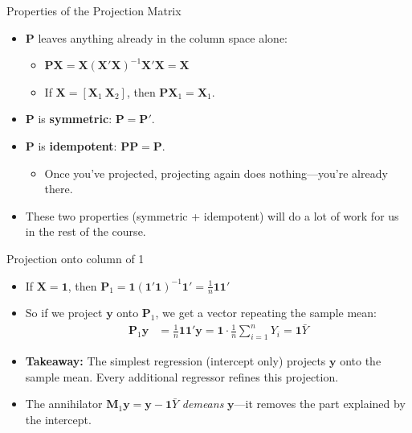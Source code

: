 \documentclass[aspectratio=169, handout]{beamer}
\numberwithin{equation}{section}
\begin{document}
\begin{frame}{Properties of the Projection Matrix}
\begin{itemize}
\item $\bm{P}$ leaves anything already in the column space alone:\pause
\begin{itemize}
\item $\bm{P}\bm{X}=\bm{X}(\bm{X}'\bm{X})^{-1}\bm{X}'\bm{X}=\bm{X}$
\item If $\bm{X}=[\bm{X}_1\ \bm{X}_2]$, then $\bm{P}\bm{X}_1=\bm{X}_1$.
\end{itemize}\pause
\item $\bm{P}$ is \textbf{symmetric}: $\bm{P}=\bm{P}'$.\pause
\item $\bm{P}$ is \textbf{idempotent}: $\bm{P}\bm{P}=\bm{P}$.
\begin{itemize}
\item Once you've projected, projecting again does nothing---you're already there.
\end{itemize}\pause
\item These two properties (symmetric + idempotent) will do a lot of work for us in the rest of the course.
\end{itemize}
\end{frame}





\begin{frame}{Projection onto column of 1}
\begin{itemize}
\item If $\bm{X}=\bm{1}$, then
$\bm{P}_1=\bm{1}(\bm{1}'\bm{1})^{-1}\bm{1}'=\frac{1}{n}\bm{1}\bm{1}'$
\item So if we project $\bm{y}$ onto $\bm{P}_1$, we get a vector repeating the sample mean:
\begin{align*}
\bm{P}_1\bm{y}&=\frac{1}{n}\bm{1}\bm{1}'\bm{y}=\bm{1}\cdot\frac{1}{n}\sum_{i=1}^nY_i=\bm{1}\bar{Y}
\end{align*}
\item \textbf{Takeaway:} The simplest regression (intercept only) projects $\bm{y}$ onto the sample mean. Every additional regressor refines this projection.
\item The annihilator $\bm{M}_1\bm{y}=\bm{y}-\bm{1}\bar{Y}$ \emph{demeans} $\bm{y}$---it removes the part explained by the intercept.
\end{itemize}
\end{frame}
\end{document}
